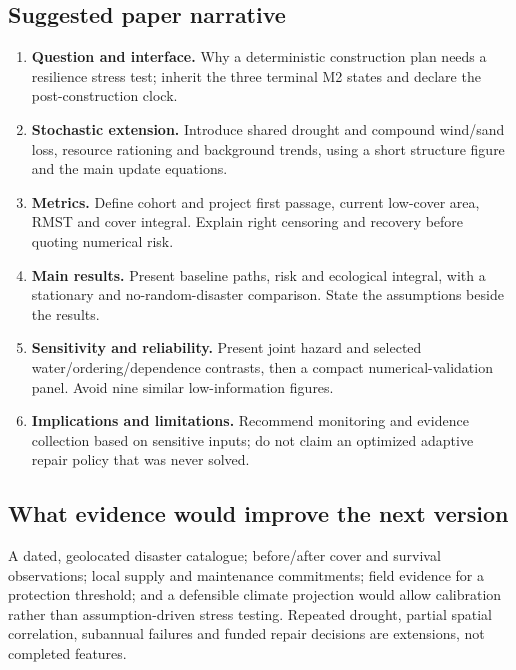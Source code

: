 \documentclass[11pt,a4paper]{article}
\begin{document}
\subsection*{Suggested paper narrative}
\begin{enumerate}
\item \textbf{Question and interface.} Why a deterministic construction plan needs a resilience stress test;
inherit the three terminal M2 states and declare the post-construction clock.
\item \textbf{Stochastic extension.} Introduce shared drought and compound wind/sand loss, resource rationing
and background trends, using a short structure figure and the main update equations.
\item \textbf{Metrics.} Define cohort and project first passage, current low-cover area, RMST and cover integral.
Explain right censoring and recovery before quoting numerical risk.
\item \textbf{Main results.} Present baseline paths, risk and ecological integral, with a stationary and
no-random-disaster comparison. State the assumptions beside the results.
\item \textbf{Sensitivity and reliability.} Present joint hazard and selected water/ordering/dependence
contrasts, then a compact numerical-validation panel. Avoid nine similar low-information figures.
\item \textbf{Implications and limitations.} Recommend monitoring and evidence collection based on sensitive
inputs; do not claim an optimized adaptive repair policy that was never solved.
\end{enumerate}

\subsection*{What evidence would improve the next version}
A dated, geolocated disaster catalogue; before/after cover and survival observations; local supply
and maintenance commitments; field evidence for a protection threshold; and a defensible climate
projection would allow calibration rather than assumption-driven stress testing. Repeated drought,
partial spatial correlation, subannual failures and funded repair decisions are extensions, not completed features.
\end{document}
